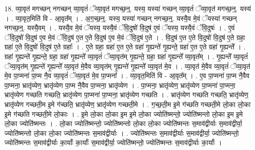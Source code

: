 \documentclass[17pt]{extarticle}
\begin{document}
18. व्या॒वृत॑ मगच्छन् नगच्छन् व्या॒वृतं॑ ॅव्या॒वृत॑ मगच्छ॒न्॒. यस्य॒ यस्या॑ गच्छन् व्या॒वृतं॑ ॅव्या॒वृत॑ मगच्छ॒न्॒. यस्य॑ । . व्या॒वृत॒मिति॑ वि - आ॒वृत᳚म् । . अ॒ग॒च्छ॒न्॒. यस्य॒ यस्या॑ गच्छन् नगच्छ॒न्॒. यस्यै॒व मे॒वं ॅयस्या॑ गच्छन् नगच्छ॒न्॒. यस्यै॒वम् । . यस्यै॒व मे॒वं ॅयस्य॒ यस्यै॒वं ॅवि॒दुषो॑ वि॒दुष॑ ए॒वं ॅयस्य॒ यस्यै॒वं ॅवि॒दुषः॑ । . ए॒वं ॅवि॒दुषो॑ वि॒दुष॑ ए॒व मे॒वं ॅवि॒दुष॑ ए॒त ए॒ते वि॒दुष॑ ए॒व मे॒वं ॅवि॒दुष॑ ए॒ते । . वि॒दुष॑ ए॒त ए॒ते वि॒दुषो॑ वि॒दुष॑ ए॒ते ग्रहा॒ ग्रहा॑ ए॒ते वि॒दुषो॑ वि॒दुष॑ ए॒ते ग्रहाः᳚ । . ए॒ते ग्रहा॒ ग्रहा॑ ए॒त ए॒ते ग्रहा॑ गृ॒ह्यन्ते॑ गृ॒ह्यन्ते॒ ग्रहा॑ ए॒त ए॒ते ग्रहा॑ गृ॒ह्यन्ते᳚ । . ग्रहा॑ गृ॒ह्यन्ते॑ गृ॒ह्यन्ते॒ ग्रहा॒ ग्रहा॑ गृ॒ह्यन्ते᳚ व्या॒वृतं॑ ॅव्या॒वृत॑म् गृ॒ह्यन्ते॒ ग्रहा॒ ग्रहा॑ गृ॒ह्यन्ते᳚ व्या॒वृत᳚म् । . गृ॒ह्यन्ते᳚ व्या॒वृतं॑ ॅव्या॒वृत॑म् गृ॒ह्यन्ते॑ गृ॒ह्यन्ते᳚ व्या॒वृत॑ मे॒वैव व्या॒वृत॑म् गृ॒ह्यन्ते॑ गृ॒ह्यन्ते᳚ व्या॒वृत॑ मे॒व । . व्या॒वृत॑ मे॒वैव व्या॒वृतं॑ ॅव्या॒वृत॑ मे॒व पा॒प्मना॑ पा॒प्म नै॒व व्या॒वृतं॑ ॅव्या॒वृत॑ मे॒व पा॒प्मना᳚ । . व्या॒वृत॒मिति॑ वि - आ॒वृत᳚म् । . ए॒व पा॒प्मना॑ पा॒प्म नै॒वैव पा॒प्मना॒ भ्रातृ॑व्येण॒ भ्रातृ॑व्येण पा॒प्म नै॒वैव पा॒प्मना॒ भ्रातृ॑व्येण । . पा॒प्मना॒ भ्रातृ॑व्येण॒ भ्रातृ॑व्येण पा॒प्मना॑ पा॒प्मना॒ भ्रातृ॑व्येण गच्छति गच्छति॒ भ्रातृ॑व्येण पा॒प्मना॑ पा॒प्मना॒ भ्रातृ॑व्येण गच्छति । . भ्रातृ॑व्येण गच्छति गच्छति॒ भ्रातृ॑व्येण॒ भ्रातृ॑व्येण गच्छती॒म इ॒मे ग॑च्छति॒ भ्रातृ॑व्येण॒ भ्रातृ॑व्येण गच्छती॒मे । . ग॒च्छ॒ती॒म इ॒मे ग॑च्छति गच्छती॒मे लो॒का लो॒का इ॒मे ग॑च्छति गच्छती॒मे लो॒काः । . इ॒मे लो॒का लो॒का इ॒म इ॒मे लो॒का ज्योति॑ष्मन्तो॒ ज्योति॑ष्मन्तो लो॒का इ॒म इ॒मे लो॒का ज्योति॑ष्मन्तः । . लो॒का ज्योति॑ष्मन्तो॒ ज्योति॑ष्मन्तो लो॒का लो॒का ज्योति॑ष्मन्तः स॒माव॑द्वीर्याः स॒माव॑द्वीर्या॒ ज्योति॑ष्मन्तो लो॒का लो॒का ज्योति॑ष्मन्तः स॒माव॑द्वीर्याः । . ज्योति॑ष्मन्तः स॒माव॑द्वीर्याः स॒माव॑द्वीर्या॒ ज्योति॑ष्मन्तो॒ ज्योति॑ष्मन्तः स॒माव॑द्वीर्याः का॒र्याः᳚ का॒र्याः᳚ स॒माव॑द्वीर्या॒ ज्योति॑ष्मन्तो॒ ज्योति॑ष्मन्तः स॒माव॑द्वीर्याः का॒र्याः᳚ । \newline
\end{document}
